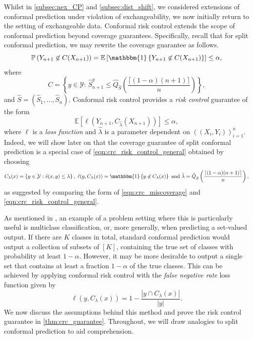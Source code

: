 \documentclass[11pt, titlepage]{article} %
\newcommand{\R}{\mathrm}
\newcommand{\Prob}[1]{\mathbb{P}\left( #1 \right)}
\newcommand{\Exp}[3]{\mathbb{E}\left#2 #1 \right#3}
\newcommand{\Ind}[1]{\mathbbm{1}\left\{ #1 \right\}}
\numberwithin{equation}{section}
\theoremstyle{definition}
\numberwithin{theorem}{section}
\numberwithin{lemma}{section}
\numberwithin{corollary}{section}
\numberwithin{proposition}{section}
\numberwithin{definition}{section}
\numberwithin{remark}{section}
\begin{document}
\noindent
Whilst in \cref{subsec:nex_CP} and \cref{subsec:dist_shift}, we considered extensions of conformal prediction under violation of exchangeability, we now initially return to the setting of exchangeable data. Conformal risk control extends the scope of conformal prediction beyond coverage guarantees. Specifically, recall that for split conformal prediction, we may rewrite the coverage guarantee as follows. \begin{equation}
    \Prob{Y_{n+1} \not \in C(X_{n+1})} = \Exp{\Ind{Y_{n+1} \not \in C(X_{n+1})}}{[}{]} \leq \alpha,
\label{eqn:crc_miscoverage}
\end{equation} where \[C = \left\{y \in \mathcal{Y}: \, \hat{S}_{n+1}^y \leq \hat{Q}_{\hat{S}}\left( \frac{\lceil (1-\alpha)(n+1) \rceil}{n} \right) \right\}, \] and \(\hat{S} = (\hat{S}_1, \ldots, \hat{S}_n).\) Conformal risk control provides a \textit{risk control} guarantee of the form \begin{equation}
    \Exp{\ell(Y_{n+1}, C_{\hat{\lambda}}(X_{n+1}))}{[}{]} \leq \alpha,
\label{eqn:crc_risk_control_general}
\end{equation} where \(\ell\) is a \textit{loss function} and \(\hat{\lambda}\) is a parameter dependent on \(((X_i, Y_i))_{i=1}^n\). Indeed, we will show later on that the coverage guarantee of split conformal prediction is a special case of \eqref{eqn:crc_risk_control_general} obtained by choosing \begin{equation}
    C_{\lambda}(x) = \left\{ y \in \mathcal{Y}: \hat{s}(x,y) \leq \lambda \right\}, \  \ell(y, C_\lambda(x)) = \Ind{y \not \in C_{\lambda}(x)} \  \R{and} \  \hat{\lambda} = \hat{Q}_{\hat{S}}\left( \frac{\lceil (1-\alpha)(n+1) \rceil}{n} \right), 
\label{eqn:crc_special_case} 
\end{equation} as suggested by comparing the form of \eqref{eqn:crc_miscoverage} and \eqref{eqn:crc_risk_control_general}. \vskip5pt

\noindent
As mentioned in \cite{angelopoulos2024riskcontrol}, an example of a problem setting where this is particularly useful is multiclass classification, or, more generally, when predicting a set-valued output. If there are \(K\) classes in total, standard conformal prediction would output a collection of subsets of \([K]\), containing the true set of classes with probability at least \(1-\alpha\). However, it may be more desirable to output a single set that contains at least a fraction \(1-\alpha\) of the true classes. This can be achieved by applying conformal risk control with the \textit{false negative rate} loss function given by 
\[
    \ell(y, C_\lambda (x)) = 1 - \frac{|y \cap C_\lambda (x)|}{|y|}.
\]
\noindent
We now discuss the assumptions behind this method and prove the risk control guarantee in \cref{thm:crc_guarantee}. Throughout, we will draw analogies to split conformal prediction to aid comprehension. \vskip5pt
\end{document}
